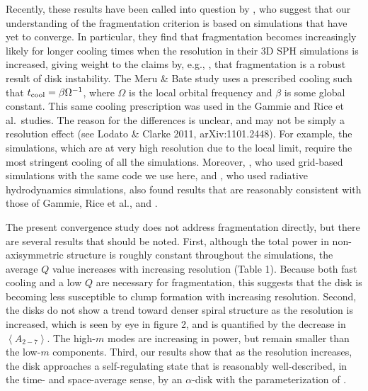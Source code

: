 \documentclass[manuscript]{aastex}
\begin{document}
Recently, these results have been called into question by \cite{meru2011a}, who suggest that our understanding of the fragmentation criterion is based on simulations that have yet to converge.  In particular, they find that fragmentation becomes increasingly likely for longer cooling times when the resolution in their 3D SPH simulations is increased, giving weight to the claims by, e.g., \cite{boss2009}, that fragmentation is a robust result of disk instability. The Meru \& Bate study uses a prescribed cooling such that $t_{\rm cool}=\beta\Omega^{-1}$, where $\Omega$ is the local orbital frequency and $\beta$ is some global constant.  This same cooling prescription was used in the Gammie and Rice et al.~studies.  The reason for the differences is unclear, and may not be simply a resolution effect (see Lodato \& Clarke 2011, arXiv:1101.2448).  For example, the \cite{gammie2001} simulations, which are at very high resolution due to the local limit, require the most stringent cooling of all the simulations.  Moreover, \cite{mejia2005}, who used grid-based simulations with the same code we use here, and  \cite{boley2008}, who used radiative hydrodynamics simulations, also found results that are reasonably consistent with those of Gammie, Rice et al., and \cite{cossins2010}. 

The present convergence study does not address fragmentation directly, but there are several results that should be noted.  First, although the total power in non-axisymmetric structure is roughly constant throughout the simulations, the average $Q$ value increases with increasing resolution (Table 1).  Because both fast cooling and a low $Q$ are necessary
for fragmentation, this suggests that the disk is becoming less susceptible to clump formation with increasing resolution.   Second, the disks do not show a trend toward denser spiral structure as the resolution is increased, which is seen by eye in figure 2, and is quantified by the decrease in $\left<A_{2-7}\right>$.  The high-$m$ modes are increasing in power, but remain smaller than the low-$m$ components.   Third, our results show that as the resolution increases, the disk approaches a self-regulating state that is reasonably well-described, in the time- and space-average sense, by an $\alpha$-disk with the parameterization of \cite{gammie2001}. 
\end{document}
